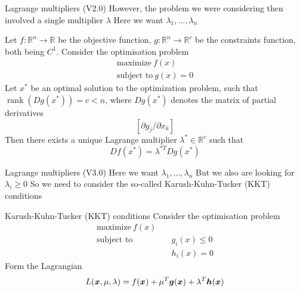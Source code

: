 \documentclass[aspectratio=169]{beamer}\usepackage[]{graphicx}\usepackage[]{xcolor}
\begin{document}
\begin{frame}{Lagrange multipliers (V2.0)}
        However, the problem we were considering then involved a single multiplier $\lambda$
        \vfill
        Here we want $\lambda_1,\ldots,\lambda_n$
\end{frame}

\begin{frame}
    \begin{theorem}
        Let $f\colon\mathbb{R}^n \rightarrow \mathbb{R}$ be the objective function, $g\colon\mathbb{R}^n \rightarrow \mathbb{R}^c $ be the constraints function, both being $C^1$.
        Consider the optimisation problem
        \begin{align*}
            \text{maximize}\ f(x) \\
            \text{subject to}\ g(x) = 0                 
        \end{align*}
        Let $x^*$ be an optimal solution to the optimization problem, such that $\operatorname{rank} (Dg(x^*)) = c < n$, where $Dg(x^*)$ denotes the matrix of partial derivatives
        \[
            \left[{\partial g_j}/{\partial x_k}\right]  
        \]
        Then there exists a unique Lagrange multiplier $\lambda^* \in \mathbb{R}^c$ such that
        \[
            Df(x^*) = \lambda^{*T}Dg(x^*)
        \]
    \end{theorem}
\end{frame}

\begin{frame}{Lagrange multipliers (V3.0)}
    Here we want $\lambda_1,\ldots,\lambda_n$
    \vfill
    But we also are looking for $\lambda_i\geq 0$
    \vfill 
    So we need to consider the so-called Karush-Kuhn-Tucker (KKT) conditions
\end{frame}

\begin{frame}{Karush-Kuhn-Tucker (KKT) conditions}
    Consider the optimisation problem
    \begin{align*}
        \text{maximize}\ f(x) \\
        \text{subject to}& \quad g_i(x) \leq 0  \\
        &\quad h_i(x)=0               
    \end{align*}
    Form the Lagrangian
    \[
        L(\bm{x},\mu,\lambda) = f(\bm{x})+\mu^T\bm{g}(\bm{x})+\lambda^T\bm{h}(\bm{x})
    \]
\end{frame}
\end{document}
